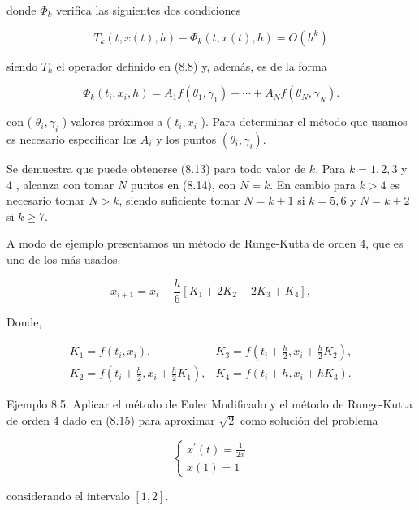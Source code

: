 \documentclass[10pt]{article}
\begin{document}
donde $\Phi_{k}$ verifica las siguientes dos condiciones


\begin{equation*}
T_{k}(t, x(t), h)-\Phi_{k}(t, x(t), h)=O\left(h^{k}\right) \tag{8.13}
\end{equation*}


siendo $T_{k}$ el operador definido en (8.8) y, además, es de la forma


\begin{equation*}
\Phi_{k}\left(t_{i}, x_{i}, h\right)=A_{1} f\left(\theta_{1}, \gamma_{1}\right)+\cdots+A_{N} f\left(\theta_{N}, \gamma_{N}\right) . \tag{8.14}
\end{equation*}


con ( $\theta_{i}, \gamma_{i}$ ) valores próximos a ( $t_{i}, x_{i}$ ). Para determinar el método que usamos es necesario especificar los $A_{i}$ y los puntos $\left(\theta_{i}, \gamma_{i}\right)$.

Se demuestra que puede obtenerse (8.13) para todo valor de $k$. Para $k=1,2,3$ y 4 , alcanza con tomar $N$ puntos en (8.14), con $N=k$. En cambio para $k>4$ es necesario tomar $N>k$, siendo suficiente tomar $N=k+1$ si $k=5,6$ y $N=k+2$ si $k \geq 7$.

A modo de ejemplo presentamos un método de Runge-Kutta de orden 4, que es uno de los más usados.


\begin{equation*}
x_{i+1}=x_{i}+\frac{h}{6}\left[K_{1}+2 K_{2}+2 K_{3}+K_{4}\right], \tag{8.15}
\end{equation*}


Donde,

$$
\begin{array}{ll}
K_{1}=f\left(t_{i}, x_{i}\right), & K_{3}=f\left(t_{i}+\frac{h}{2}, x_{i}+\frac{h}{2} K_{2}\right), \\
K_{2}=f\left(t_{i}+\frac{h}{2}, x_{i}+\frac{h}{2} K_{1}\right), & K_{4}=f\left(t_{i}+h, x_{i}+h K_{3}\right) .
\end{array}
$$

Ejemplo 8.5. Aplicar el método de Euler Modificado y el método de Runge-Kutta de orden 4 dado en (8.15) para aproximar $\sqrt{2}$ como solución del problema

$$
\left\{\begin{array}{l}
x^{\prime}(t)=\frac{1}{2 x} \\
x(1)=1
\end{array}\right.
$$

considerando el intervalo $[1,2]$.
\end{document}
